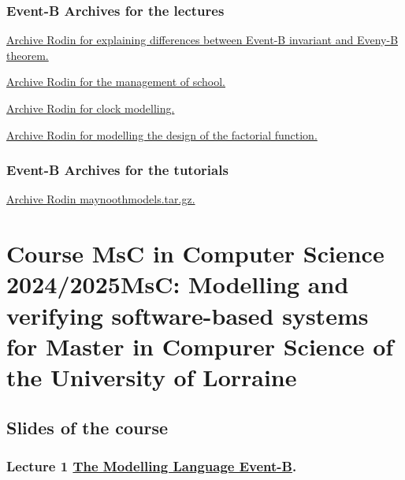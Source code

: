 \documentclass[ 12pt]{article}
\begin{document}
\subsubsection{Event-B Archives for the  lectures}

 \href{http://mery54.github.io/teaching/mosos/lecturesnotes/
   ex-safety.zip}{Archive Rodin  for  explaining differences between
   Event-B invariant and Eveny-B theorem. }


 
 \href{http://mery54.github.io/teaching/mosos/models/
   ex-school.zip}{Archive Rodin  for   the management of school. }

 
 
 \href{http://mery54.github.io/teaching/mosos/models/clock-tut0.zip}{Archive Rodin  for  clock modelling. }

  \href{http://mery54.github.io/teaching/mosos/lecturesnotes/factorial-plugin-tutO.zip}{Archive Rodin  for   modelling  the 
   design of the factorial function.}
  


 \subsubsection{Event-B Archives for   the tutorials}
\label{sec:event-b-archives}



\href{http://mery54.github.io/teaching/mosos/models/maynoothmodels.tar.gz}{Archive
  Rodin  maynoothmodels.tar.gz.}



\hrulefill

\section{Course  MsC in Computer Science 2024/2025MsC:  Modelling and verifying software-based systems for
  Master in Compurer Science of the University of Lorraine}
\label{sec:course-modell-verify}


\subsection{Slides of the course}
\label{sec:slides-course}

\subsubsection{Lecture 1 
  \href{http://mery54.github.io/teaching/mosos/lecturesnotes/masterillect1-1.pdf}{The 
    Modelling Language Event-B}.}
\end{document}
